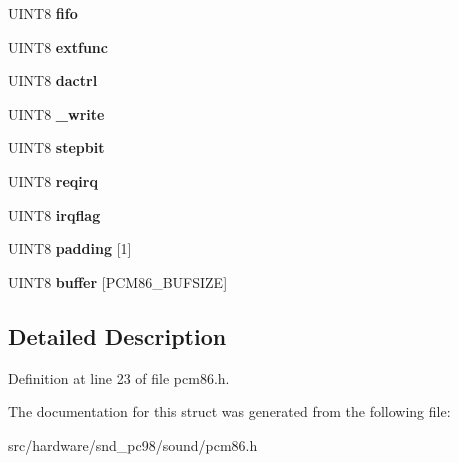 \begin{DoxyCompactItemize}
\item 
\hypertarget{struct__PCM86_a7e9d306be6c7183d68b643f935f52fa6}{U\-I\-N\-T8 {\bfseries fifo}}\label{struct__PCM86_a7e9d306be6c7183d68b643f935f52fa6}

\item 
\hypertarget{struct__PCM86_a5ece966a5489dbf1b15dc0cbb63897e7}{U\-I\-N\-T8 {\bfseries extfunc}}\label{struct__PCM86_a5ece966a5489dbf1b15dc0cbb63897e7}

\item 
\hypertarget{struct__PCM86_aff2b2d0951ef324dffaa06ba69b1bad5}{U\-I\-N\-T8 {\bfseries dactrl}}\label{struct__PCM86_aff2b2d0951ef324dffaa06ba69b1bad5}

\item 
\hypertarget{struct__PCM86_ab71218d2300ebad20757b1da2f1111b4}{U\-I\-N\-T8 {\bfseries \-\_\-write}}\label{struct__PCM86_ab71218d2300ebad20757b1da2f1111b4}

\item 
\hypertarget{struct__PCM86_ab4702ad5ca23061433f4e61c8283d28b}{U\-I\-N\-T8 {\bfseries stepbit}}\label{struct__PCM86_ab4702ad5ca23061433f4e61c8283d28b}

\item 
\hypertarget{struct__PCM86_a009f7d3e9a6d92202e356f92c8777001}{U\-I\-N\-T8 {\bfseries reqirq}}\label{struct__PCM86_a009f7d3e9a6d92202e356f92c8777001}

\item 
\hypertarget{struct__PCM86_a36b505198123a3b7b456d3a4b6fe2d6f}{U\-I\-N\-T8 {\bfseries irqflag}}\label{struct__PCM86_a36b505198123a3b7b456d3a4b6fe2d6f}

\item 
\hypertarget{struct__PCM86_aab0394943031486b24fe2b11e8e55201}{U\-I\-N\-T8 {\bfseries padding} \mbox{[}1\mbox{]}}\label{struct__PCM86_aab0394943031486b24fe2b11e8e55201}

\item 
\hypertarget{struct__PCM86_a8c7d96d00bf3d0b6b168cadc033d4f7c}{U\-I\-N\-T8 {\bfseries buffer} \mbox{[}P\-C\-M86\-\_\-\-B\-U\-F\-S\-I\-Z\-E\mbox{]}}\label{struct__PCM86_a8c7d96d00bf3d0b6b168cadc033d4f7c}

\end{DoxyCompactItemize}


\subsection{Detailed Description}


Definition at line 23 of file pcm86.\-h.



The documentation for this struct was generated from the following file\-:\begin{DoxyCompactItemize}
\item 
src/hardware/snd\-\_\-pc98/sound/pcm86.\-h\end{DoxyCompactItemize}
